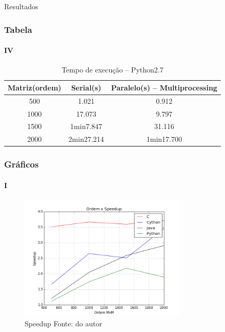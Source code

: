 \documentclass[aspectratio=169]{beamer}
\begin{document}
\begin{frame}{Resultados}
\frametitle{Tabela}
\framesubtitle{IV}

\begin{table}[H]
  \centering
  \caption{Tempo de execução -- Python2.7}
  \begin{tabular}{ccc}
    \hline
    Matriz(ordem) & Serial(s) & Paralelo(s) -- Multiprocessing \\
    \hline
    \hline
    500 & 1.021 &  0.912 \\
    1000 & 17.073 & 9.797\\
    1500 & 1min7.847 & 31.116\\
    2000 & 2min27.214 & 1min17.700\\
    \hline
  \end{tabular}
  \label{tab:timePy2}
\end{table}

\end{frame}



\begin{frame}
\frametitle{Gráficos}
\framesubtitle{I}

\begin{figure}
  \centering
  \includegraphics[width=8cm]{pictures/speedup_full2.png}
  \caption{Speedup {\small Fonte: do autor}}
\end{figure}

\end{frame}
\end{document}
